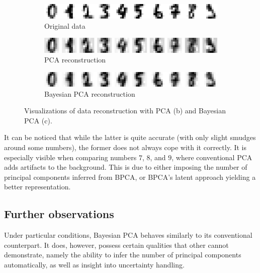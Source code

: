 \begin{figure}[h]
     \centering
     \begin{subfigure}[b]{0.9\textwidth}
         \centering
         \includegraphics[width=\textwidth]{observational/img/bpca/bpca_reconstruction_original.png}
         \caption{Original data}
     \end{subfigure} 
     \par\bigskip
     \begin{subfigure}[b]{0.9\textwidth}
         \centering
         \includegraphics[width=\textwidth]{observational/img/bpca/bpca_reconstruction_pca.png}
         \caption{PCA reconstruction}
     \end{subfigure}  
     \par\bigskip
     \begin{subfigure}[b]{0.9\textwidth}
         \centering
         \includegraphics[width=\textwidth]{observational/img/bpca/bpca_reconstruction_bpca.png}
         \caption{Bayesian PCA reconstruction}
     \end{subfigure} 
     \caption[Reconstruction of data with PCA and BPCA]{Visualizations of data reconstruction with PCA (b) and Bayesian PCA (c).}
    \label{fig:bpca-reconstruction}
\end{figure}

\vspace{\baselineskip}
It can be noticed that while the latter is quite accurate (with only slight smudges around some numbers), the former does not always cope with it correctly. It is especially visible when comparing numbers $7$, $8$, and $9$, where conventional PCA adds artifacts to the background. This is due to either imposing the number of principal components inferred from BPCA, or BPCA's latent approach yielding a better representation.

\subsection{Further observations}\label{subsec:bpca-conclusions}
Under particular conditions, Bayesian PCA behaves similarly to its conventional counterpart. It does, however, possess certain qualities that other cannot demonstrate, namely the ability to infer the number of principal components automatically, as well as insight into uncertainty handling. 

